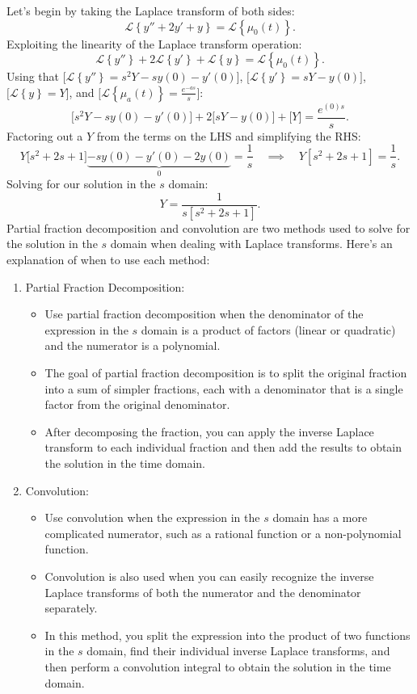 \documentclass[a4paper,12pt]{article}
\begin{document}
Let's begin by taking the Laplace transform of both sides:
$$ \mathcal{L}\left\{y'' + 2y' + y\right\} = \mathcal{L}\left\{\mu_{0}(t)\right\}. $$
Exploiting the linearity of the Laplace transform operation:
$$ \mathcal{L}\left\{y''\right\} + 2\mathcal{L}\left\{y'\right\} + \mathcal{L}\left\{y\right\} = \mathcal{L}\left\{\mu_0(t)\right\}. $$
Using that $\big[\mathcal{L}\left\{y''\right\} = s^2Y-sy(0)-y'(0)\big]$, $\big[\mathcal{L}\left\{y'\right\} = sY-y(0)\big]$, $\big[\mathcal{L}\left\{y\right\}=Y\big]$, and $\big[\mathcal{L}\left\{\mu_a(t)\right\} = \frac{e^{-as}}{s}\big]$:
$$ \big[s^2Y -sy(0) -y'(0)\big] + 2\big[sY-y(0)\big] + \big[Y\big] = \frac{e^{(0)s}}{s}.$$
Factoring out a $Y$ from the terms on the LHS and simplifying the RHS:
$$ Y\big[s^2 + 2s + 1\big] \underbrace{-sy(0) - y'(0) -2y(0)}_{0} = \frac{1}{s} \quad\implies\quad Y[s^2 + 2s + 1] = \frac{1}{s}. $$
Solving for our solution in the $s$ domain:
$$ Y = \frac{1}{s[s^2 + 2s + 1]}. $$
Partial fraction decomposition and convolution are two methods used to solve for the solution in the $s$ domain when dealing with Laplace transforms. Here's an explanation of when to use each method:
\begin{enumerate}
\item Partial Fraction Decomposition:
\begin{itemize}
\item Use partial fraction decomposition when the denominator of the expression in the $s$ domain is a product of factors (linear or quadratic) and the numerator is a polynomial.
\item The goal of partial fraction decomposition is to split the original fraction into a sum of simpler fractions, each with a denominator that is a single factor from the original denominator.
\item After decomposing the fraction, you can apply the inverse Laplace transform to each individual fraction and then add the results to obtain the solution in the time domain.
\end{itemize}
\item Convolution:
\begin{itemize}
\item Use convolution when the expression in the $s$ domain has a more complicated numerator, such as a rational function or a non-polynomial function.
\item Convolution is also used when you can easily recognize the inverse Laplace transforms of both the numerator and the denominator separately.
\item In this method, you split the expression into the product of two functions in the $s$ domain, find their individual inverse Laplace transforms, and then perform a convolution integral to obtain the solution in the time domain.
\end{itemize}
\end{enumerate}
\end{document}
